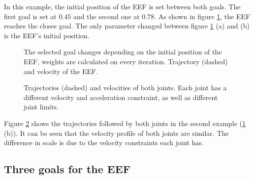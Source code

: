 In this example, the initial position of the EEF is set between both goals. The first goal is set at $0.45$ and the second one at $0.78$. As shown in figure \ref{fig:dynamic}, the EEF reaches the closes goal. The only parameter changed between figure \ref{fig:dynamic} (a) and (b) is the EEF's initial position. 
\begin{figure}[H]
	\centering
	\begin{subfigure}[EEF closer to goal 2 (thick dotted line)]
		{\texttt{[image: controllers/dynamic\_1.png]}}
	\end{subfigure}
	\begin{subfigure}[EEF closer to goal 1 (thin dotted line)]
		{\texttt{[image: controllers/dynamic\_2.png]}}
	\end{subfigure}
	\vspace{-12pt}
	\caption[Dynamic weights: EEF]{The selected goal changes depending on the initial position of the EEF, weights are calculated on every iteration. Trajectory (dashed) and velocity of the EEF.}
	\vspace{-10pt}
	\label{fig:dynamic}
\end{figure}

\begin{figure}[H]
	\centering
	\begin{subfigure}[Joint $q_0$]
		{\texttt{[image: controllers/dynamic\_3.png]}}
	\end{subfigure}
	\begin{subfigure}[Joint $q_1$]
		{\texttt{[image: controllers/dynamic\_4.png]}}
	\end{subfigure}
	\vspace{-12pt}
	\caption[Dynamic weights: Joints]{Trajectories (dashed) and velocities of both joints. Each joint has a different velocity and acceleration constraint, as well as different joint limits.}
	\vspace{-10pt}
	\label{fig:dynamic_j}
\end{figure}

Figure \ref{fig:dynamic_j} shows the trajectories followed by both joints in the second example (\ref{fig:dynamic} (b)). It can be seen that the velocity profile of both joints are similar. The difference in scale is due to the velocity constraints each joint has.

\subsection{Three goals for the EEF}

